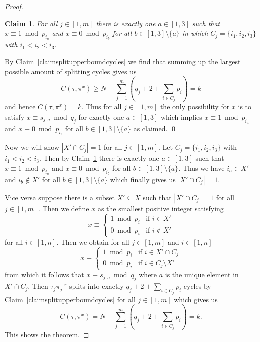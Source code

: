 \documentclass{article}
\newtheorem{claim}{Claim}
\begin{document}
\begin{proof}
\begin{claim}\label{claimexactlyonea}
For all $j \in [1,m]$ there is exactly one $a \in [1,3]$ such that $x \equiv 1 \bmod p_{i_a}$ and $x \equiv 0 \bmod p_{i_b}$ for all $b \in [1,3] \setminus \{a\}$ in which $C_j = \{i_1,i_2,i_3\}$ with $i_1 < i_2 < i_3$.
\end{claim}
By Claim~\ref{claimsplitupperboundcycles} we find that summing up the largest possible amount of splitting cycles gives us
\begin{displaymath}
C(\tau,\pi^x) \geq N - \sum_{j=1}^m (q_j + 2 + \sum_{i \in C_j} p_i) = k
\end{displaymath}
and hence $C(\tau,\pi^x) = k$. Thus for all $j \in [1,m]$ the only possibility for $x$ is to satisfy $x \equiv s_{j,a} \bmod q_j$ for exactly one $a \in [1,3]$ which implies $x \equiv 1 \bmod p_{i_a}$ and $x \equiv 0 \bmod p_{i_b}$ for all $b \in [1,3] \setminus \{a\}$ as claimed.
\qed

Now we will show $|X' \cap C_j| = 1$ for all $j \in [1,m]$. Let $C_j = \{i_1,i_2,i_3\}$ with $i_1 < i_2 < i_3$. Then by Claim~\ref{claimexactlyonea} there is exactly one $a \in [1,3]$ such that $x \equiv 1 \bmod p_{i_a}$ and $x \equiv 0 \bmod p_{i_b}$ for all $b \in [1,3] \setminus \{a\}$. Thus we have $i_a \in X'$ and $i_b \notin X'$ for all $b \in [1,3] \setminus \{a\}$ which finally gives us $|X' \cap C_j| = 1$.

Vice versa suppose there is a subset $X' \subseteq X$ such that $|X' \cap C_j| = 1$ for all $j \in [1,m]$. Then we define $x$ as the smallest positive integer satisfying
\begin{displaymath}
x \equiv \begin{cases}
1 \bmod p_i & \text{if } i \in X'\\
0 \bmod p_i & \text{if } i \notin X'
\end{cases}
\end{displaymath}
for all $i \in [1,n]$. Then we obtain for all $j \in [1,m]$ and $i \in [1,n]$
\begin{displaymath}
x \equiv \begin{cases}
1 \bmod p_i & \text{if } i \in X' \cap C_j\\
0 \bmod p_i & \text{if } i \in C_j \setminus X'
\end{cases}
\end{displaymath}
from which it follows that $x \equiv s_{j,a} \bmod q_j$ where $a$ is the unique element in $X' \cap C_j$. Then $\tau_j\pi_j^{-x}$ splits into exactly $q_j + 2 + \sum_{i \in C_j} p_i$ cycles by Claim~\ref{claimsplitupperboundcycles} for all $j \in [1,m]$ which gives us
\begin{displaymath}
C(\tau,\pi^x) = N - \sum_{j=1}^m (q_j + 2 + \sum_{i \in C_j} p_i) = k.
\end{displaymath}
This shows the theorem.
\end{proof}
\end{document}
